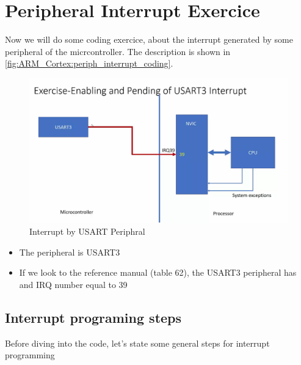 \newpage
\section{Peripheral Interrupt Exercice}

Now we will do some coding exercice, about the interrupt generated by some peripheral of the micrcontroller. The description is shown in \autoref{fig:ARM_Cortex:periph_interrupt_coding}.

\begin{figure}[h]
\centering
\includegraphics[scale=0.4,frame]{Figures/ARM_Cortex/periph_interrupt_coding}
\caption{Interrupt by USART Periphral}
\label{fig:ARM_Cortex:periph_interrupt_coding}
\end{figure}

\begin{itemize}

\item The peripheral is USART3

\item If we look to the reference manual (table 62), the USART3 peripheral has and IRQ number equal to 39

\end{itemize}

\subsection{Interrupt programing steps}

Before diving into the code, let's state some general steps for interrupt programming

